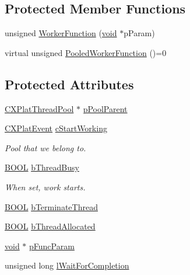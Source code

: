 \subsection*{\-Protected \-Member \-Functions}
\begin{DoxyCompactItemize}
\item 
unsigned \hyperlink{class_c_x_plat_pooled_thread_a8b181531a0345e3e3b7381122766218f}{\-Worker\-Function} (\hyperlink{_cpclient_8h_a6464f7480a0fd0ee170cba12b2c0497f}{void} $\ast$p\-Param)
\item 
virtual unsigned \hyperlink{class_c_x_plat_pooled_thread_a398deb73c58c851f5f93a6b3d5ba5106}{\-Pooled\-Worker\-Function} ()=0
\end{DoxyCompactItemize}
\subsection*{\-Protected \-Attributes}
\begin{DoxyCompactItemize}
\item 
\hyperlink{class_c_x_plat_thread_pool}{\-C\-X\-Plat\-Thread\-Pool} $\ast$ \hyperlink{class_c_x_plat_pooled_thread_ad6ceff927d5ff0e06eec0d99aebb1b10}{p\-Pool\-Parent}
\item 
\hyperlink{class_c_x_plat_event}{\-C\-X\-Plat\-Event} \hyperlink{class_c_x_plat_pooled_thread_aa72050f5a65f4117e41aec984a976fac}{c\-Start\-Working}
\begin{DoxyCompactList}\small\item\em \-Pool that we belong to. \end{DoxyCompactList}\item 
\hyperlink{_cpclient_8h_a3be13892ae7076009afcf121347dd319}{\-B\-O\-O\-L} \hyperlink{class_c_x_plat_pooled_thread_ae9df7cdc87ca6ebf387fb4cf42836417}{b\-Thread\-Busy}
\begin{DoxyCompactList}\small\item\em \-When set, work starts. \end{DoxyCompactList}\item 
\hyperlink{_cpclient_8h_a3be13892ae7076009afcf121347dd319}{\-B\-O\-O\-L} \hyperlink{class_c_x_plat_pooled_thread_ab708ae971b8acdc4830987ea93ee4e52}{b\-Terminate\-Thread}
\item 
\hyperlink{_cpclient_8h_a3be13892ae7076009afcf121347dd319}{\-B\-O\-O\-L} \hyperlink{class_c_x_plat_pooled_thread_af269720f4a5cd4e294d9b5fa7aebd50a}{b\-Thread\-Allocated}
\item 
\hyperlink{_cpclient_8h_a6464f7480a0fd0ee170cba12b2c0497f}{void} $\ast$ \hyperlink{class_c_x_plat_pooled_thread_a76d10e5c387e927b7c3c553673e98a0c}{p\-Func\-Param}
\item 
unsigned long \hyperlink{class_c_x_plat_pooled_thread_a55185bc10d6367eaaf05fbd1e6ed3701}{l\-Wait\-For\-Completion}
\end{DoxyCompactItemize}
